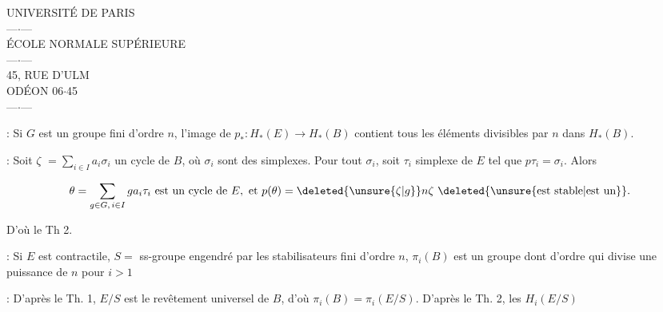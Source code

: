 
\begin{center}
UNIVERSITÉ DE PARIS\\
---$\cdot$---\\
ÉCOLE NORMALE SUPÉRIEURE\\
---$\cdot$---\\
45, RUE D'ULM\\
ODÉON 06$\cdot$45\\
---$\cdot$---
\end{center}


 : Si $G$ est un groupe fini d'ordre $n$, l'image de $p_*:H_*(E)\longrightarrow H_*(B)$ contient tous les éléments  divisibles par $n$ dans $H_*(B)$.

 : Soit $\zeta$  $=\sum_{i\in I}a_i\sigma_i$ un cycle de $B$, où $\sigma_i$ sont des simplexes. Pour tout $\sigma_i$, soit $\tau_i$ simplexe de $E$ tel que $p\tau_i=\sigma_i$. Alors

\[
\theta=\sum_{g\in G,\,i\in I}ga_i\tau_i\ \text{est un cycle de } E,\ \text{et }p(\theta)=\deleted{\unsure{\zeta|g}}n\zeta\ \text{\deleted{\unsure{est stable|est un}}}.
\]

D'où le Th 2.

 : Si  $E$ est  contractile, $S={}$ ss-groupe engendré par les stabilisateurs fini d'ordre $n$, $\pi_i(B)$ est un groupe  dont  d'ordre qui divise une puissance de $n$ pour $i>1$

 :  D'après le Th. 1, $E/S$ est le revêtement universel de $B$, d'où $\pi_i(B)=\pi_i(E/S)$. D'après le Th. 2,  les $H_i(E/S)$


